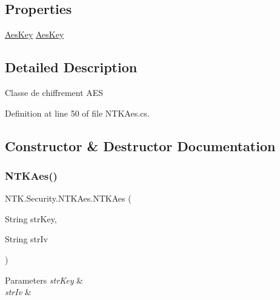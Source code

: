 \subsection*{Properties}
\begin{DoxyCompactItemize}
\item 
\mbox{\hyperlink{struct_n_t_k_1_1_security_1_1_aes_key}{Aes\+Key}} \mbox{\hyperlink{class_n_t_k_1_1_security_1_1_n_t_k_aes_a7e45b5269a21d530fdc1447631d9dd3e}{Aes\+Key}}
\end{DoxyCompactItemize}


\subsection{Detailed Description}
Classe de chiffrement A\+ES 



Definition at line 50 of file N\+T\+K\+Aes.\+cs.



\subsection{Constructor \& Destructor Documentation}
\mbox{\label{class_n_t_k_1_1_security_1_1_n_t_k_aes_a68f8ea8c2559da1a7d2a3d1677145cd1}} 
\subsubsection{\texorpdfstring{NTKAes()}{NTKAes()}\hspace{0.1cm}{\footnotesize\ttfamily [1/3]}}
{\footnotesize\ttfamily N\+T\+K.\+Security.\+N\+T\+K\+Aes.\+N\+T\+K\+Aes (\begin{DoxyParamCaption}\item[{String}]{str\+Key,  }\item[{String}]{str\+Iv }\end{DoxyParamCaption})}






\begin{DoxyParams}{Parameters}
{\em str\+Key} & \\
\hline
{\em str\+Iv} & \\
\hline
\end{DoxyParams}


